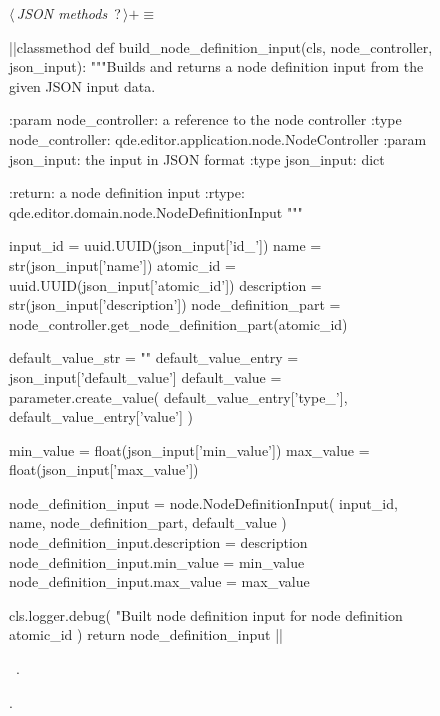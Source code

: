\documentclass[%
    a4paper,    %
    justified,  %
    nobib,      %
    openany     %
]{tufte-book}
\makeatletter
\renewcommand{\label}[1]{\@tufte@label{##1}}%
\makeatother
\begin{document}
\begin{figure}
\begin{flushleft} \small
\begin{minipage}{\linewidth}\label{scrap127}\raggedright\small
{} $\langle\,${\itshape JSON methods}\nobreak\ {\footnotesize {?}}$\,\rangle+\equiv$
\vspace{-1ex}
\begin{pythoncode}
|\normalfont{}\fontfamily{}|classmethod
def build_node_definition_input(cls, node_controller, json_input):
    """Builds and returns a node definition input from the given JSON input
    data.

    :param node_controller: a reference to the node controller
    :type  node_controller: qde.editor.application.node.NodeController
    :param json_input: the input in JSON format
    :type  json_input: dict

    :return: a node definition input
    :rtype:  qde.editor.domain.node.NodeDefinitionInput
    """

    input_id             = uuid.UUID(json_input['id_'])
    name                 = str(json_input['name'])
    atomic_id            = uuid.UUID(json_input['atomic_id'])
    description          = str(json_input['description'])
    node_definition_part = node_controller.get_node_definition_part(atomic_id)

    default_value_str = ""
    default_value_entry = json_input['default_value']
    default_value = parameter.create_value(
        default_value_entry['type_'],
        default_value_entry['value']
    )

    min_value = float(json_input['min_value'])
    max_value = float(json_input['max_value'])

    node_definition_input = node.NodeDefinitionInput(
        input_id,
        name,
        node_definition_part,
        default_value
    )
    node_definition_input.description = description
    node_definition_input.min_value = min_value
    node_definition_input.max_value = max_value

    cls.logger.debug(
        "Built node definition input for node definition %
        atomic_id
    )
    return node_definition_input
|\NWsep|
\end{pythoncode}
\vspace{1.5ex}
\footnotesize
\begin{list}{}{\setlength{\itemsep}{-\parsep}\setlength{\itemindent}{-\leftmargin}}
\item \NWtxtMacroDefBy\ .
\item {\NWtxtMacroNoRef}.


\end{list}
\end{minipage}
\end{flushleft}
\end{figure}
\end{document}
